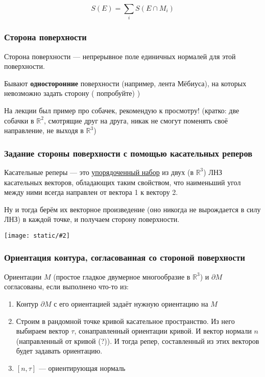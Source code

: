 \documentclass{article}
\def\images#1#2{\begin{center}\texttt{[image: static/\#2]}\end{center}}
\begin{document}
\[S(E) = \sum_i S(E \cap M_i)\]

\subsubsection{Сторона поверхности}

Сторона поверхности --- непрерывное поле единичных нормалей для этой поверхности.

Бывают \textbf{односторонние} поверхности (например, лента Мёбиуса), на которых невозможно задать сторону ( попробуйте) )

На лекции был пример про собачек, рекомендую к просмотру! (кратко: две собачки в $\mathbb{R}^2$, смотрящие друг на друга, никак не смогут поменять своё направление, не выходя в $\mathbb{R}^3$)

\subsubsection{Задание стороны поверхности с помощью касательных реперов}

Касательные реперы --- это \underline{упорядоченный набор} из двух (в $\mathbb{R}^3$) ЛНЗ касательных векторов, обладающих таким свойством, что наименьший угол между ними всегда направлен от вектора 1 к вектору 2.

Ну и тогда берём их векторное произведение (оно никогда не вырождается в силу ЛНЗ) в каждой точке, и получаем сторону поверхности.

\images{0.3}{kas_repe.jpg}

\subsubsection{Ориентация контура, согласованная со стороной поверхности}

Ориентации $M$ (простое гладкое двумерное многообразие в $\mathbb{R}^3$) и $\partial M$ согласованы, если выполнено что-то из:

\begin{enumerate}
    \item Контур $\partial M$ с его ориентацией задаёт нужную ориентацию на $M$ 
    \item Строим в рандомной точке кривой касательное пространство. Из него выбираем вектор $\tau$, сонаправленный ориентации кривой. И вектор нормали $n$ (направленный от кривой (?)). И тогда репер, составленный из этих векторов будет задавать ориентацию.
    \item $[n, \tau]$ --- ориентирующая нормаль
\end{enumerate}
\end{document}
